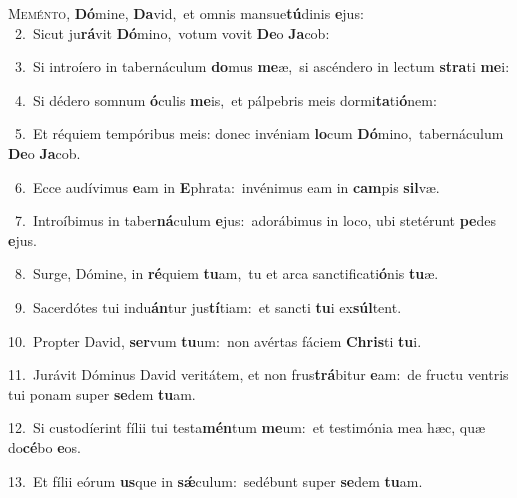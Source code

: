 \lettrine{\initial\textcolor{\initialcolor}{M}}{eménto,} \textbf{Dó}\-mine, \textbf{Da}\-vid,~\star et omnis mansue\-\textbf{tú}\-dinis \textbf{e}\-jus:\\
{\numbfont\textcolor{\numbcolor}{~2.}}~Sicut ju\-\textbf{rá}\-vit \textbf{Dó}\-mino,~\star votum vovit \textbf{De}\-o \textbf{Ja}\-cob:\par
{\numbfont\textcolor{\numbcolor}{~3.}}~Si introíero in tabernáculum \textbf{do}\-mus \textbf{me}\-æ,~\star si ascéndero in lectum \textbf{stra}\-ti \textbf{me}\-i:\par
{\numbfont\textcolor{\numbcolor}{~4.}}~Si dédero somnum \textbf{ó}\-culis \textbf{me}\-is,~\star et pálpebris meis dormi\-\textbf{ta}\-ti\-\textbf{ó}\-nem:\par
{\numbfont\textcolor{\numbcolor}{~5.}}~Et réquiem tempóribus meis: donec invéniam \textbf{lo}\-cum \textbf{Dó}\-mino,~\star tabernáculum \textbf{De}\-o \textbf{Ja}\-cob.\par
{\numbfont\textcolor{\numbcolor}{~6.}}~Ecce audívimus \textbf{e}\-am in \textbf{E}\-phrata:~\star invénimus eam in \textbf{cam}\-pis \textbf{sil}\-væ.\par
{\numbfont\textcolor{\numbcolor}{~7.}}~Introíbimus in taber\-\textbf{ná}\-culum \textbf{e}\-jus:~\star adorábimus in loco, ubi stetérunt \textbf{pe}\-des \textbf{e}\-jus.\par
{\numbfont\textcolor{\numbcolor}{~8.}}~Surge, Dómine, in \textbf{ré}\-quiem \textbf{tu}\-am,~\star tu et arca sanctificati\-\textbf{ó}\-nis \textbf{tu}\-æ.\par
{\numbfont\textcolor{\numbcolor}{~9.}}~Sacerdótes tui indu\-\textbf{án}\-tur jus\-\textbf{tí}\-tiam:~\star et sancti \textbf{tu}\-i ex\-\textbf{súl}\-tent.\par
{\numbfont\textcolor{\numbcolor}{10.}}~Propter David, \textbf{ser}\-vum \textbf{tu}\-um:~\star non avértas fáciem \textbf{Chris}\-ti \textbf{tu}\-i.\par
{\numbfont\textcolor{\numbcolor}{11.}}~Jurávit Dóminus David veritátem, et non frus\-\textbf{trá}\-bitur \textbf{e}\-am:~\star de fructu ventris tui ponam super \textbf{se}\-dem \textbf{tu}\-am.\par
{\numbfont\textcolor{\numbcolor}{12.}}~Si custodíerint fílii tui testa\-\textbf{mén}\-tum \textbf{me}\-um:~\star et testimónia mea hæc, quæ do\-\textbf{cé}\-bo \textbf{e}\-os.\par
{\numbfont\textcolor{\numbcolor}{13.}}~Et fílii eórum \textbf{us}\-que in \textbf{sǽ}\-culum:~\star sedébunt super \textbf{se}\-dem \textbf{tu}\-am.\par
